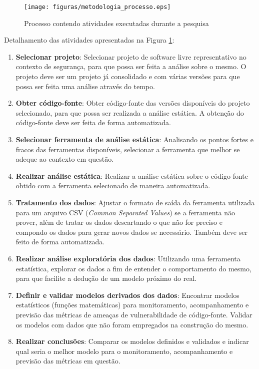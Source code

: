 \begin{figure}[h]
  \centering
  \texttt{[image: figuras/metodologia\_processo.eps]}
  \caption{Processo contendo atividades executadas durante a pesquisa}
  \label{fig:processo}
\end{figure}

Detalhamento das atividades apresentadas na Figura \ref{fig:processo}:

\begin{enumerate}
  \item \textbf{Selecionar projeto}: Selecionar projeto de software livre
  representativo no contexto de segurança, para que possa ser feita a análise
  sobre o mesmo. O projeto deve ser um projeto já consolidado e com várias
  versões para que possa ser feita uma análise através do tempo.

  \item \textbf{Obter código-fonte}: Obter código-fonte das versões disponíveis
  do projeto selecionado, para que possa ser realizada a análise estática. A
  obtenção do código-fonte deve ser feita de forma automatizada.

  \item \textbf{Selecionar ferramenta de análise estática}: Analisando os pontos
  fortes e fracos das ferramentas disponíveis, selecionar a ferramenta que
  melhor se adeque ao contexto em questão.

  \item \textbf{Realizar análise estática}: Realizar a análise estática sobre o
  código-fonte obtido com a ferramenta selecionado de maneira automatizada.

  \item \textbf{Tratamento dos dados}: Ajustar o formato de saída da ferramenta
  utilizada para um arquivo CSV (\textit{Common Separated Values}) se a
  ferramenta não prover, além de tratar os dados descartando o que não for
  preciso e compondo os dados para gerar novos dados se necessário. Também deve
  ser feito de forma automatizada.

  \item \textbf{Realizar análise exploratória dos dados}: Utilizando uma
  ferramenta estatística, explorar os dados a fim de entender o comportamento do
  mesmo, para que facilite a dedução de um modelo próximo do real.

  \item \textbf{Definir e validar modelos derivados dos dados}: Encontrar
  modelos estatísticos (funções matemáticas) para monitoramento, acompanhamento e
  previsão das métricas de ameaças de vulnerabilidade de código-fonte. Validar
  os modelos com dados que não foram empregados na construção do mesmo.

  \item \textbf{Realizar conclusões}: Comparar os modelos definidos e validados
  e indicar qual seria o melhor modelo para o monitoramento, acompanhamento e
  previsão das métricas em questão.
\end{enumerate}



